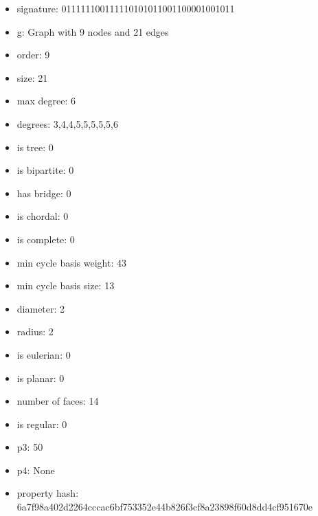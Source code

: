 \newpage
\begin{figure}
\end{figure}
\begin{itemize}
\item signature: 011111100111110101011001100001001011
\item g: Graph with 9 nodes and 21 edges
\item order: 9
\item size: 21
\item max degree: 6
\item degrees: 3,4,4,5,5,5,5,5,6
\item is tree: 0
\item is bipartite: 0
\item has bridge: 0
\item is chordal: 0
\item is complete: 0
\item min cycle basis weight: 43
\item min cycle basis size: 13
\item diameter: 2
\item radius: 2
\item is eulerian: 0
\item is planar: 0
\item number of faces: 14
\item is regular: 0
\item p3: 50
\item p4: None
\item property hash: 6a7f98a402d2264cccac6bf753352e44b826f3cf8a23898f60d8dd4cf951670e
\end{itemize}
